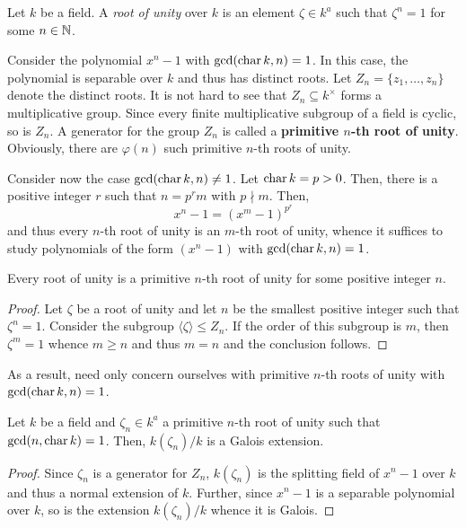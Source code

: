 \begin{definition}
    Let $k$ be a field. A \textit{root of unity} over $k$ is an element $\zeta\in k^a$ such that $\zeta^n = 1$ for some $n\in\mathbb{N}$.
\end{definition}

\begin{mdframed}
    Consider the polynomial $x^n - 1$ with $\gcd(\operatorname{char} k, n) = 1$. In this case, the polynomial is separable over $k$ and thus has distinct roots. Let $Z_n = \{z_1,\dots,z_n\}$ denote the distinct roots. It is not hard to see that $Z_n\subseteq k^\times$ forms a multiplicative group. Since every finite multiplicative subgroup of a field is cyclic, so is $Z_n$. A generator for the group $Z_n$ is called a \textbf{primitive $n$-th root of unity}. Obviously, there are $\varphi(n)$ such primitive $n$-th roots of unity.

    Consider now the case $\gcd(\operatorname{char} k, n)\ne 1$. Let $\operatorname{char} k = p > 0$. Then, there is a positive integer $r$ such that $n = p^rm$ with $p\nmid m$. Then, 
    \begin{equation*}
        x^n - 1 = \left(x^m - 1\right)^{p^r}
    \end{equation*}
    and thus every $n$-th root of unity is an $m$-th root of unity, whence it suffices to study polynomials of the form $(x^n - 1)$ with $\gcd(\operatorname{char} k, n) = 1$.
\end{mdframed}

\begin{proposition}
    Every root of unity is a primitive $n$-th root of unity for some positive integer $n$.
\end{proposition}
\begin{proof}
    Let $\zeta$ be a root of unity and let $n$ be the smallest positive integer such that $\zeta^n = 1$. Consider the subgroup $\langle\zeta\rangle\le Z_n$. If the order of this subgroup is $m$, then $\zeta^m = 1$ whence $m\ge n$ and thus $m = n$ and the conclusion follows.
\end{proof}

As a result, need only concern ourselves with primitive $n$-th roots of unity with $\gcd(\operatorname{char} k, n) = 1$.

\begin{proposition}
    Let $k$ be a field and $\zeta_n\in k^a$ a primitive $n$-th root of unity such that $\gcd(n,\operatorname{char} k) = 1$. Then, $k(\zeta_n)/k$ is a Galois extension.
\end{proposition}
\begin{proof}
    Since $\zeta_n$ is a generator for $Z_n$, $k(\zeta_n)$ is the splitting field of $x^n - 1$ over $k$ and thus a normal extension of $k$. Further, since $x^n - 1$ is a separable polynomial over $k$, so is the extension $k(\zeta_n)/k$ whence it is Galois.
\end{proof}


